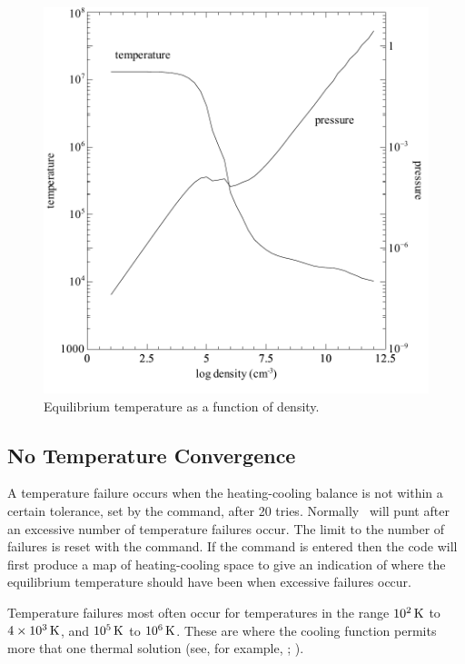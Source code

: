 \begin{figure}
\centering
\includegraphics[scale=0.8]{hazy_kmt}
\caption[Temperature vs density in photoionization equilibrium]{\label{fig:hazy_kmt}Equilibrium temperature as a function of density.}
\end{figure}

\subsection{No Temperature Convergence}

A temperature failure occurs when the heating-cooling balance is not
within a certain tolerance,
set by the  command,
after 20 tries.
Normally \Cloudy\ will punt after an excessive number of temperature
failures occur.
The limit to the number of failures is reset with the
 command.
If the  command is entered then the code
will first produce a map of heating-cooling space to give an indication
of where the equilibrium temperature should have been when excessive
failures occur.

Temperature failures most often occur for temperatures
in the range $10^2 {\rm\thinspace K}$
to $4\times 10^3 {\rm\thinspace K}$, and $10^5 {\rm\thinspace K}$ to $10^6 {\rm\thinspace K}$.
These are where the cooling function permits
more that one thermal solution (see, for example, \citealp{Williams1967}; \citealp{Dalgarno1972}).


